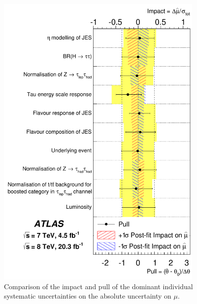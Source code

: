 \clearpage

\begin{figure}[tp]
  \centering
  \includegraphics[width=0.90\textwidth]{figures/HIGG-2013-32/fig_07}
  \caption{Comparison of the impact and pull of the dominant individual systematic uncertainties on the absolute uncertainty on $\mu$.}
  \label{fig:results-uncertainties-2}
\end{figure}

\clearpage

